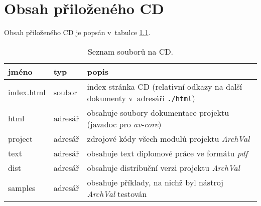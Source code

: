 \chapter{Obsah přiloženého CD}

Obsah přiloženého CD je popsán v~tabulce \ref{cd_files_table}.

\begin{table}[ht]
  \centering
  \begin{tabular}{|l|l|p{20em}|}
    \hline
    jméno & typ & popis \\
    \hline
    \hline
    index.html & soubor & index stránka CD (relativní odkazy na další dokumenty v~adresáři \verb+./html+) \\
    \hline
    html & adresář & obsahuje soubory dokumentace projektu (javadoc pro \emph{av-core}) \\
    \hline
    project & adresář & zdrojové kódy všech modulů projektu \emph{ArchVal} \\
    \hline
    text & adresář & obsahuje text diplomové práce ve formátu \emph{pdf} \\
    \hline
    dist & adresář & obsahuje distribuční verzi projektu \emph{ArchVal} \\
    \hline
    samples & adresář & obsahuje příklady, na nichž byl nástroj \emph{ArchVal} testován \\
    \hline
  \end{tabular}
  \caption{Seznam souborů na CD. \label{cd_files_table}}
\end{table}

